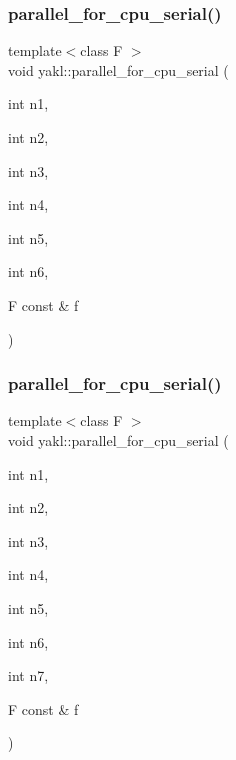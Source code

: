 \subsubsection{\texorpdfstring{parallel\+\_\+for\+\_\+cpu\+\_\+serial()}{parallel\_for\_cpu\_serial()}\hspace{0.1cm}{\footnotesize\ttfamily [6/8]}}
{\footnotesize\ttfamily template$<$class F $>$ \\
void yakl\+::parallel\+\_\+for\+\_\+cpu\+\_\+serial (\begin{DoxyParamCaption}\item[{int}]{n1,  }\item[{int}]{n2,  }\item[{int}]{n3,  }\item[{int}]{n4,  }\item[{int}]{n5,  }\item[{int}]{n6,  }\item[{F const \&}]{f }\end{DoxyParamCaption})\hspace{0.3cm}{\ttfamily [inline]}}

\mbox{\label{namespaceyakl_aa76038bc159013bfaed3a8eceac9590f}} 
\subsubsection{\texorpdfstring{parallel\+\_\+for\+\_\+cpu\+\_\+serial()}{parallel\_for\_cpu\_serial()}\hspace{0.1cm}{\footnotesize\ttfamily [7/8]}}
{\footnotesize\ttfamily template$<$class F $>$ \\
void yakl\+::parallel\+\_\+for\+\_\+cpu\+\_\+serial (\begin{DoxyParamCaption}\item[{int}]{n1,  }\item[{int}]{n2,  }\item[{int}]{n3,  }\item[{int}]{n4,  }\item[{int}]{n5,  }\item[{int}]{n6,  }\item[{int}]{n7,  }\item[{F const \&}]{f }\end{DoxyParamCaption})\hspace{0.3cm}{\ttfamily [inline]}}

